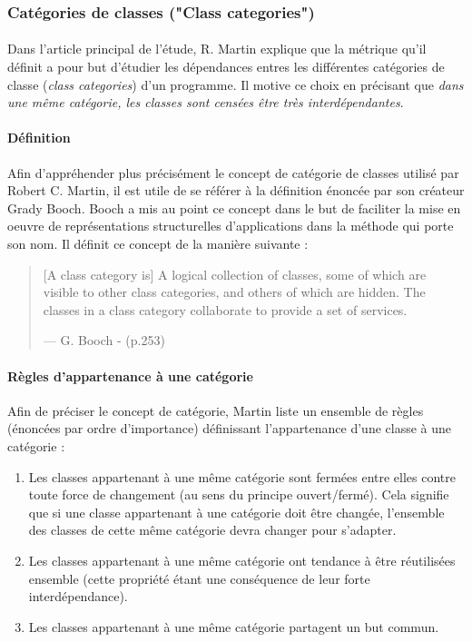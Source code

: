 \documentclass{scrartcl}
\begin{document}
\subsubsection{Catégories de classes ("Class categories")}
    \paragraph{}Dans l'article principal de l'étude\cite{Martin:1994}, R. Martin explique que la métrique qu'il définit a pour but d'étudier les dépendances entres les différentes catégories de classe (\emph{class categories}) d'un programme. Il motive ce choix en précisant que \og \textit{dans une même catégorie, les classes sont censées être très interdépendantes}\fg.
    
    \paragraph{Définition}Afin d'appréhender plus précisément le concept de catégorie de classes utilisé par Robert C. Martin, il est utile de se référer à la définition énoncée par son créateur Grady Booch\cite{Booch:1991}. Booch a mis au point ce concept dans le but de faciliter la mise en oeuvre de représentations structurelles d'applications dans la méthode qui porte son nom. Il définit ce concept de la manière suivante : 
    \begin{quote}
        [A class category is] A logical collection of classes, some of which are visible to other class categories, and others of which are hidden. The classes in a class category collaborate to provide a set of services.
        \begin{flushright}--- G. Booch - \cite{Booch:1991} (p.253)\end{flushright}
    \end{quote}



    \paragraph{Règles d'appartenance à une catégorie}Afin de préciser le concept de catégorie, Martin liste un ensemble de règles (énoncées par ordre d'importance) définissant l'appartenance d'une classe à une catégorie :
    \begin{enumerate}
        \item Les classes appartenant à une même catégorie sont fermées entre elles contre toute force de changement (au sens du principe ouvert/fermé). Cela signifie que si une classe appartenant à une catégorie doit être changée, l'ensemble des classes de cette même catégorie devra changer pour s'adapter. 
        \item Les classes appartenant à une même catégorie ont tendance à être réutilisées ensemble (cette propriété étant une conséquence de leur forte interdépendance).
        \item Les classes appartenant à une même catégorie partagent un but commun.
    \end{enumerate}
\end{document}
